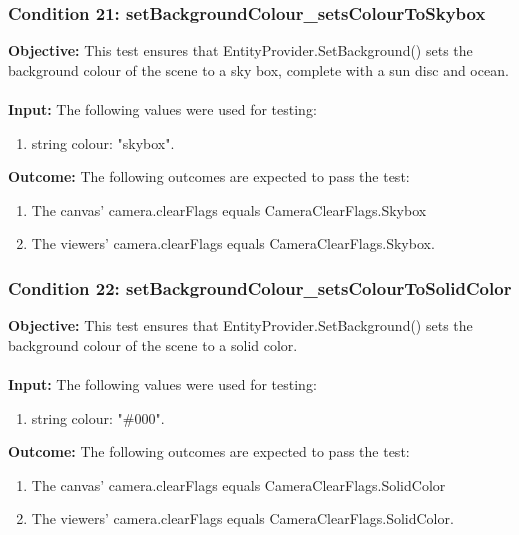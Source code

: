 \documentclass[a4paper,12pt]{article}
\begin{document}
		\subsubsection{Condition 21: setBackgroundColour\_setsColourToSkybox}
			\textbf{Objective:} This test ensures that EntityProvider.SetBackground() sets the background colour of the scene to a sky box, complete with a sun disc and ocean.\\\\
			\textbf{Input:} The following values were used for testing:
				\begin{enumerate}
					\item string colour: "skybox".
				\end{enumerate}
			\textbf{Outcome:} The following outcomes are expected to pass the test:
				\begin{enumerate}
					\item The canvas' camera.clearFlags equals CameraClearFlags.Skybox
					\item The viewers' camera.clearFlags equals CameraClearFlags.Skybox.
				\end{enumerate}
		\subsubsection{Condition 22: setBackgroundColour\_setsColourToSolidColor}
			\textbf{Objective:} This test ensures that EntityProvider.SetBackground() sets the background colour of the scene to a solid color.\\\\
			\textbf{Input:} The following values were used for testing:
				\begin{enumerate}
					\item string colour: "\#000".
				\end{enumerate}
			\textbf{Outcome:} The following outcomes are expected to pass the test:
				\begin{enumerate}
					\item The canvas' camera.clearFlags equals CameraClearFlags.SolidColor
					\item The viewers' camera.clearFlags equals CameraClearFlags.SolidColor.
				\end{enumerate}
\end{document}

